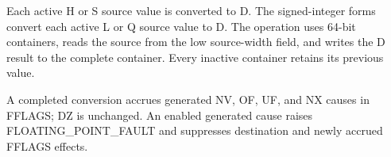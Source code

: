 Each active H or S source value is converted to D. The signed-integer forms
convert each active L or Q source value to D. The operation uses 64-bit
containers, reads the source from the low source-width field, and writes the D
result to the complete container. Every inactive container retains its
previous value.

A completed conversion accrues generated NV, OF, UF, and NX causes in FFLAGS;
DZ is unchanged. An enabled generated cause raises FLOATING\_POINT\_FAULT and
suppresses destination and newly accrued FFLAGS effects.
